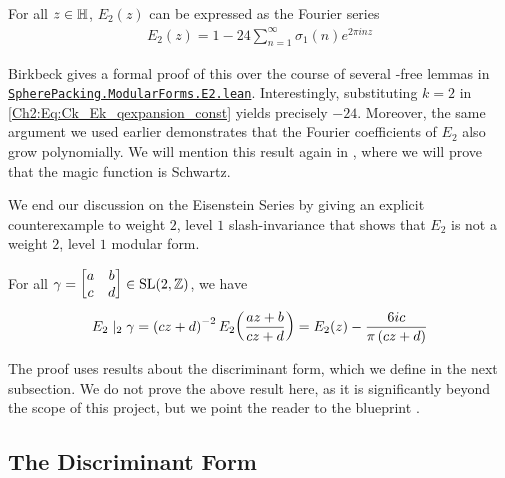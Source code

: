 \begin{boxtheorem}\label{Ch2:Thm:E2_qexpansion}
    For all $z \in \mathbb{H}$, $E_2(z)$ can be expressed as the Fourier series
    \begin{align}
        E_2(z) = 1 - 24 \sum_{n=1}^{\infty} \sigma_1(n) e^{2 \pi i n z}
        \label{Ch2:Eq:E2_qexpansion}
    \end{align}
\end{boxtheorem}

Birkbeck gives a formal proof of this over the course of several \sorry-free lemmas in \href{https://github.com/thefundamentaltheor3m/Sphere-Packing-Lean/blob/076f4b8d6a37fa95de3bc4764a5d7f911fde91e0/SpherePacking/ModularForms/E2.lean#L736}{\texttt{SpherePacking.ModularForms.E2.lean}}. Interestingly, substituting $k = 2$ in \eqref{Ch2:Eq:Ck_Ek_qexpansion_const} yields precisely $-24$. Moreover, the same argument we used earlier demonstrates that the Fourier coefficients of $E_2$ also grow polynomially. We will mention this result again in , where we will prove that the magic function is Schwartz.

 We end our discussion on the Eisenstein Series by giving an explicit counterexample to weight $2$, level $1$ slash-invariance that shows that $E_2$ is not a weight $2$, level $1$ modular form.

\begin{boxlemma}\label{Ch2:Lemma:E2_slash_action}
    For all $\gamma = \begin{bmatrix} a & b \\ c & d \end{bmatrix} \in \operatorname{SL}\!\left( 2, \mathbb{Z} \right)$, we have
    \begin{align*}
        E_2 \mid_2 \gamma = \left( cz + d \right)^{-2} E_2\!\left( \frac{az + b}{cz + d} \right) = E_2(z) - \frac{6ic}{\pi\left( cz + d \right)}
    \end{align*}
\end{boxlemma}

The proof uses results about the discriminant form, which we define in the next subsection. We do not prove the above result here, as it is significantly beyond the scope of this project, but we point the reader to the blueprint \cite[Lemma 6.39]{blueprint}.

\subsection{The Discriminant Form}

